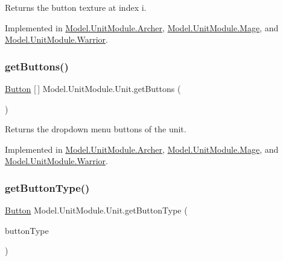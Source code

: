 Returns the button texture at index i. 

Implemented in \hyperlink{class_model_1_1_unit_module_1_1_archer_a6890f21c7dd51b1e22fed4047906f85f}{Model.\+Unit\+Module.\+Archer}, \hyperlink{class_model_1_1_unit_module_1_1_mage_ac15d8706f49bcd67b7492e4e91eff15b}{Model.\+Unit\+Module.\+Mage}, and \hyperlink{class_model_1_1_unit_module_1_1_warrior_a57f0ec7afa2f99e178b63fa0e4f455d5}{Model.\+Unit\+Module.\+Warrior}.

\hypertarget{interface_model_1_1_unit_module_1_1_unit_a5256d2141e9c59e0454e47ac65246bda}{}\label{interface_model_1_1_unit_module_1_1_unit_a5256d2141e9c59e0454e47ac65246bda} 
\subsubsection{\texorpdfstring{get\+Buttons()}{getButtons()}}
{\footnotesize\ttfamily \hyperlink{class_model_1_1_button}{Button} \mbox{[}$\,$\mbox{]} Model.\+Unit\+Module.\+Unit.\+get\+Buttons (\begin{DoxyParamCaption}{ }\end{DoxyParamCaption})}

Returns the dropdown menu buttons of the unit. 

Implemented in \hyperlink{class_model_1_1_unit_module_1_1_archer_a8306cd02babf69626ce85bed7e76d089}{Model.\+Unit\+Module.\+Archer}, \hyperlink{class_model_1_1_unit_module_1_1_mage_a830affe9a902833c691f89d103b50d31}{Model.\+Unit\+Module.\+Mage}, and \hyperlink{class_model_1_1_unit_module_1_1_warrior_af234ef405cb908c373946d012bac57be}{Model.\+Unit\+Module.\+Warrior}.

\hypertarget{interface_model_1_1_unit_module_1_1_unit_a6e9528d09bca7702fe99cc95135ede36}{}\label{interface_model_1_1_unit_module_1_1_unit_a6e9528d09bca7702fe99cc95135ede36} 
\subsubsection{\texorpdfstring{get\+Button\+Type()}{getButtonType()}}
{\footnotesize\ttfamily \hyperlink{class_model_1_1_button}{Button} Model.\+Unit\+Module.\+Unit.\+get\+Button\+Type (\begin{DoxyParamCaption}\item[{\hyperlink{namespace_model_ac76b3489c9d704f49912608bd36cd0e7}{Button\+Type}}]{button\+Type }\end{DoxyParamCaption})}


